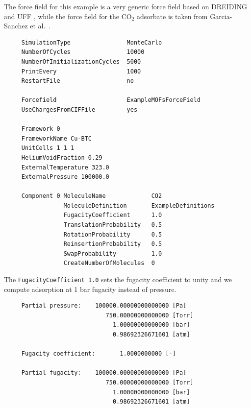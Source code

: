 The force field for this example is a very generic force field based on DREIDING \cite{Mayo1992} and UFF \cite{Rappe1992}, while
the force field for the CO$_2$ adsorbate is taken from Garcia-Sanchez et al.\ \cite{GarciaSanchez2009}.
\begin{tiny}
\begin{verbatim}
     SimulationType                MonteCarlo
     NumberOfCycles                10000
     NumberOfInitializationCycles  5000
     PrintEvery                    1000
     RestartFile                   no
     
     Forcefield                    ExampleMOFsForceField
     UseChargesFromCIFFile         yes
     
     Framework 0
     FrameworkName Cu-BTC
     UnitCells 1 1 1
     HeliumVoidFraction 0.29
     ExternalTemperature 323.0
     ExternalPressure 100000.0
     
     Component 0 MoleculeName             CO2
                 MoleculeDefinition       ExampleDefinitions
                 FugacityCoefficient      1.0
                 TranslationProbability   0.5
                 RotationProbability      0.5
                 ReinsertionProbability   0.5
                 SwapProbability          1.0
                 CreateNumberOfMolecules  0
\end{verbatim}
\end{tiny}
The \verb+FugacityCoefficient 1.0+ sets the fugacity coefficient to unity and we compute adsorption at 1 bar fugacity instead of pressure.
\begin{tiny}
\begin{verbatim}
     Partial pressure:    100000.00000000000000 [Pa]
                             750.00000000000000 [Torr]
                               1.00000000000000 [bar]
                               0.98692326671601 [atm]
     
     Fugacity coefficient:       1.0000000000 [-]
     
     Partial fugacity:    100000.00000000000000 [Pa]
                             750.00000000000000 [Torr]
                               1.00000000000000 [bar]
                               0.98692326671601 [atm]
\end{verbatim}
\end{tiny}

